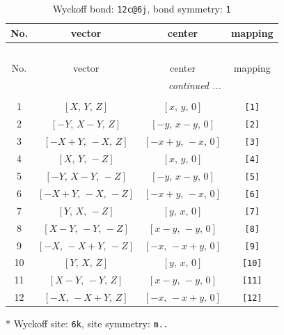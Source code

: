 \documentclass[fleqn,8pt]{jsarticle}
\begin{document}
\begin{longtable}{cccc}
\caption{Wyckoff bond: {\tt 12c@6j}, bond symmetry: {\tt 1}}
 \\
 \hline \hline
No. & vector & center & mapping \\ \hline \endfirsthead

\multicolumn{3}{l}{\tablename\ \thetable{}} \\
 \hline \hline
No. & vector & center & mapping \\ \hline \endhead

 \hline \hline
\multicolumn{3}{r}{\footnotesize\it continued ...} \\ \endfoot

 \hline \hline
\multicolumn{3}{r}{} \\ \endlastfoot

1 & $\left[ X,\, Y,\, Z \right]$ & $\left[ x,\, y,\, 0 \right]$ & {\tt [1]} \\ \hline
2 & $\left[ - Y,\, X - Y,\, Z \right]$ & $\left[ - y,\, x - y,\, 0 \right]$ & {\tt [2]} \\ \hline
3 & $\left[ - X + Y,\, - X,\, Z \right]$ & $\left[ - x + y,\, - x,\, 0 \right]$ & {\tt [3]} \\ \hline
4 & $\left[ X,\, Y,\, - Z \right]$ & $\left[ x,\, y,\, 0 \right]$ & {\tt [4]} \\ \hline
5 & $\left[ - Y,\, X - Y,\, - Z \right]$ & $\left[ - y,\, x - y,\, 0 \right]$ & {\tt [5]} \\ \hline
6 & $\left[ - X + Y,\, - X,\, - Z \right]$ & $\left[ - x + y,\, - x,\, 0 \right]$ & {\tt [6]} \\ \hline
7 & $\left[ Y,\, X,\, - Z \right]$ & $\left[ y,\, x,\, 0 \right]$ & {\tt [7]} \\ \hline
8 & $\left[ X - Y,\, - Y,\, - Z \right]$ & $\left[ x - y,\, - y,\, 0 \right]$ & {\tt [8]} \\ \hline
9 & $\left[ - X,\, - X + Y,\, - Z \right]$ & $\left[ - x,\, - x + y,\, 0 \right]$ & {\tt [9]} \\ \hline
10 & $\left[ Y,\, X,\, Z \right]$ & $\left[ y,\, x,\, 0 \right]$ & {\tt [10]} \\ \hline
11 & $\left[ X - Y,\, - Y,\, Z \right]$ & $\left[ x - y,\, - y,\, 0 \right]$ & {\tt [11]} \\ \hline
12 & $\left[ - X,\, - X + Y,\, Z \right]$ & $\left[ - x,\, - x + y,\, 0 \right]$ & {\tt [12]} \\
\end{longtable}
* Wyckoff site: {\tt 6k}, site symmetry: {\tt m..}
\renewcommand{\arraystretch}{1.2}
\end{document}
